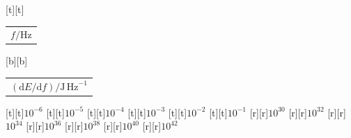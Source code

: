 %    
%
%
\begin{psfrags}%
\psfragscanon%
%
[t][t]{\color[rgb]{0,0,0}\setlength{\tabcolsep}{0pt}\begin{tabular}{c}{\Large$f/\mathrm{Hz}$}\end{tabular}}%
[b][b]{\color[rgb]{0,0,0}\setlength{\tabcolsep}{0pt}\begin{tabular}{c}{\Large$(\mathrm{d}E/\mathrm{d}{f})/\mathrm{J\,Hz}^{-1}$}\end{tabular}}%
%
[t][t]{$10^{-6}$}%
[t][t]{$10^{-5}$}%
[t][t]{$10^{-4}$}%
[t][t]{$10^{-3}$}%
[t][t]{$10^{-2}$}%
[t][t]{$10^{-1}$}%
%
[r][r]{$10^{30}$}%
[r][r]{$10^{32}$}%
[r][r]{$10^{34}$}%
[r][r]{$10^{36}$}%
[r][r]{$10^{38}$}%
[r][r]{$10^{40}$}%
[r][r]{$10^{42}$}%
%
%
\end{psfrags}%
%
